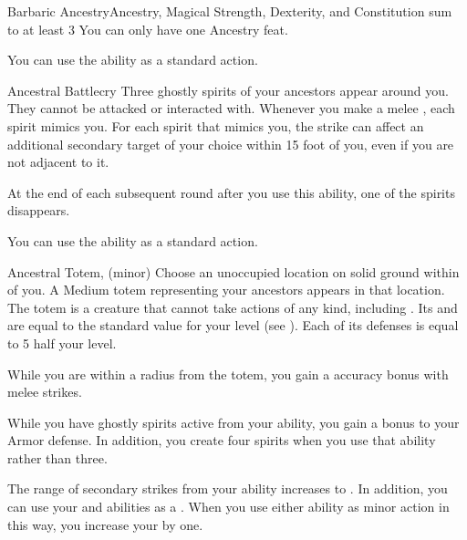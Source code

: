     \begin{magicalfeat}{Barbaric Ancestry}{Ancestry, Magical}
        \featpre Strength, Dexterity, and Constitution sum to at least 3
         You can only have one Ancestry feat.

         You can use the  ability as a standard action.
        \begin{magicalactiveability}{Ancestral Battlecry}
            Three ghostly spirits of your ancestors appear around you.
            They cannot be attacked or interacted with.
            Whenever you make a melee , each spirit mimics you.
            For each spirit that mimics you, the strike can affect an additional secondary target of your choice within 15 foot  of you, even if you are not adjacent to it.

            At the end of each subsequent round after you use this ability, one of the spirits disappears.
        \end{magicalactiveability}

         You can use the  ability as a standard action.
        \begin{magicalsustainability}{Ancestral Totem}{,  (minor)}
            Choose an unoccupied location on solid ground within \shortrange of you.
            A Medium totem representing your ancestors appears in that location.
            The totem is a creature that cannot take actions of any kind, including .
            Its  and  are equal to the standard value for your level (see ).
            Each of its defenses is equal to 5 \add half your level.

            While you are within a \medarea radius  from the totem, you gain a  accuracy bonus with melee strikes.
        \end{magicalsustainability}

         While you have ghostly spirits active from your  ability, you gain a  bonus to your Armor defense.
        In addition, you create four spirits when you use that ability rather than three.

         The range of secondary strikes from your  ability increases to \shortrange.
        In addition, you can use your  and  abilities as a .
        When you use either ability as minor action in this way, you increase your  by one.
    \end{magicalfeat}

